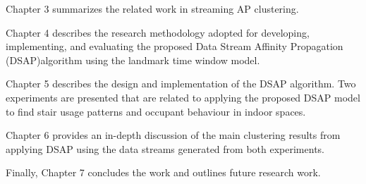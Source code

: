 Chapter 3 summarizes the related work in streaming AP clustering.

Chapter 4 describes the research methodology adopted for developing, implementing, and evaluating the proposed Data Stream Affinity Propagation (DSAP)algorithm using the landmark time window model. 

Chapter 5 describes the  design  and  implementation  of  the  DSAP  algorithm. Two  experiments  are  presented  that  are  related  to  applying  the proposed DSAP model to find stair usage patterns and occupant behaviour in indoor spaces.

Chapter 6 provides an in-depth discussion of the main  clustering  results  from  applying DSAP using  the  data  streams  generated  from  both  experiments. 

Finally, Chapter 7 concludes the work and outlines future research work.
% 







